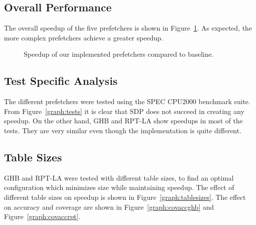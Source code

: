 \subsection{Overall Performance}
The overall speedup of the five prefetchers is shown in
Figure~\ref{graph:base}. As expected, the more complex prefetchers
achieve a greater speedup.
\begin{figure}[h]
    \caption{Speedup of our implemented prefetchers compared to baseline.}
    \label{graph:base}
\end{figure}

\subsection{Test Specific Analysis}
The different prefetchers were tested using the SPEC CPU2000 benchmark
suite. From Figure~\ref{graph:tests} it is clear that SDP does not
succeed in creating any speedup. On the other hand, GHB and RPT-LA
show speedups in most of the tests.  They are very similar even though
the implementation is quite different.

\subsection{Table Sizes}
GHB and RPT-LA were tested with different table sizes, to find an
optimal configuration which minimizes size while maintaining
speedup. The effect of different table sizes on speedup is shown in
Figure~\ref{graph:tablesizes}. The effect on accuracy and coverage are
shown in Figure~\ref{graph:covaccghb} and
Figure~\ref{graph:covaccrpt}.

